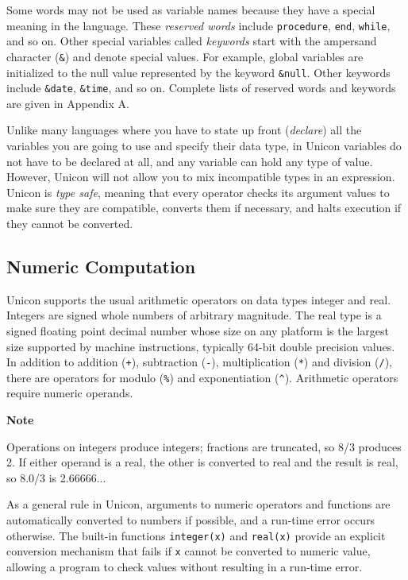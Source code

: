 Some words may not be used as variable names because they have a special
meaning in the language. These \textit{reserved
words} include \texttt{procedure}, \texttt{end},
\texttt{while}, and so on. Other special variables called
\textit{keywords} start with the ampersand
character (\texttt{\&}) and denote special values. For example, global
variables are initialized to the null value represented by the keyword
\texttt{\&null}. Other keywords
include \texttt{\&date}, \texttt{\&time}, and so on.
Complete lists of reserved words and keywords are given in Appendix A.

Unlike many languages where you have to state up front
(\textit{declare}) all the variables you are going to use\textit{ }and
specify their data type, in Unicon variables do not have to be declared
at all, and any variable can hold any type of value. However, Unicon
will not allow you to mix incompatible types in an expression. Unicon
is \textit{type safe}, meaning that every operator
checks its argument values to make sure they are compatible, converts
them if necessary, and halts execution if they cannot be converted.

\subsection[Numeric Computation]{Numeric Computation}
Unicon supports the usual arithmetic operators on
data types integer and real. Integers are
signed whole numbers of arbitrary magnitude. The real type is a signed
floating point decimal number whose size on any
platform is the largest size supported by machine instructions,
typically 64-bit double precision values. In addition to
addition (\texttt{+}), subtraction
(\texttt{{}-}), multiplication (\texttt{*}) and
division (\texttt{/}), there are operators for
modulo (\texttt{\%}) and exponentiation (\texttt{\^{}}). Arithmetic operators require
numeric operands.

{\sffamily\bfseries
Note}

{\sffamily
Operations on integers produce integers; fractions are truncated, so 8/3
produces 2. If either operand is a real, the other is converted to real
and the result is real, so 8.0/3 is 2.66666...}

As a general rule in Unicon, arguments to numeric operators and
functions are automatically converted to numbers if possible, and a run-time error occurs otherwise. The built-in functions
\texttt{integer(x)} and
\texttt{real(x)} provide an explicit conversion
mechanism that fails if \texttt{x} cannot be converted to numeric
value, allowing a program to check values without resulting in a
run-time error.

